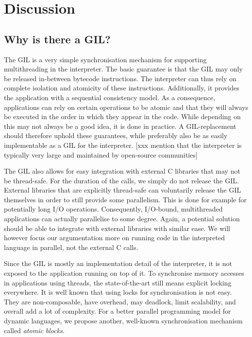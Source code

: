 \documentclass{sigplanconf}
\begin{document}
\section{Discussion}



\subsection{Why is there a GIL?}
The GIL is a very simple synchronisation mechanism for supporting
multithreading in the interpreter. The basic guarantee is that the
GIL may only be released in-between bytecode instructions. The
interpreter can thus rely on complete isolation and atomicity of these
instructions. Additionally, it provides the application with a
sequential consistency model. As a consequence, applications can rely
on certain operations to be atomic and that they will always be
executed in the order in which they appear in the code. While
depending on this may not always be a good idea, it is done in
practice. A GIL-replacement should therefore uphold these
guarantees, while preferably also be as easily implementable as a GIL
for the interpreter.
[xxx mention that the interpreter is typically very large and maintained
by open-source communities]

The GIL also allows for easy integration with external C libraries that
may not be thread-safe. For the duration of the calls, we
simply do not release the GIL. External libraries that are explicitly
thread-safe can voluntarily release the GIL themselves in order to
still provide some parallelism. This is done for example for
potentially long I/O operations. Consequently, I/O-bound,
multithreaded applications can actually parallelise to some
degree. Again, a potential solution should be able to integrate with
external libraries with similar ease. We will however focus our
argumentation more on running code in the interpreted language in
parallel, not the external C calls.

Since the GIL is mostly an implementation detail of the interpreter,
it is not exposed to the application running on top of it. To
synchronise memory accesses in applications using threads, the
state-of-the-art still means explicit locking everywhere. It is well
known that using locks for synchronisation is not easy.  They are
non-composable, have overhead, may deadlock, limit scalability, and
overall add a lot of complexity. For a better parallel programming
model for dynamic languages, we propose another, well-known
synchronisation mechanism called \emph{atomic blocks}.
\end{document}
